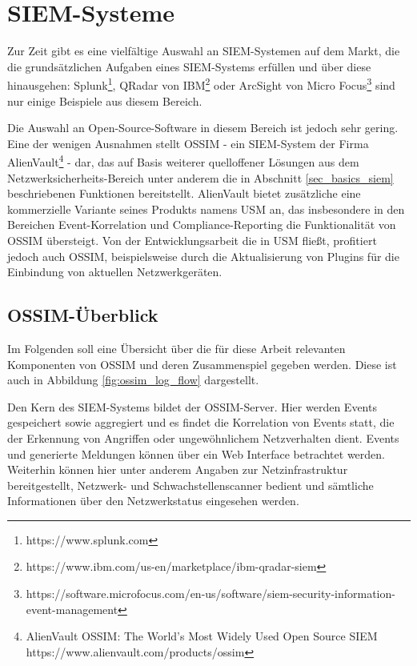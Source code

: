 \section{SIEM-Systeme}

\label{sec_state_siem}

Zur Zeit gibt es eine vielfältige Auswahl an SIEM-Systemen auf dem Markt, die die grundsätzlichen Aufgaben eines SIEM-Systems erfüllen und über diese hinausgehen: Splunk\footnote{
  https://www.splunk.com
}, QRadar von IBM\footnote{
  https://www.ibm.com/us-en/marketplace/ibm-qradar-siem
} oder ArcSight von Micro Focus\footnote{
  https://software.microfocus.com/en-us/software/siem-security-information-event-management
} sind nur einige Beispiele aus diesem Bereich. 

Die Auswahl an Open-Source-Software in diesem Bereich ist jedoch sehr gering. Eine der wenigen Ausnahmen stellt OSSIM - ein SIEM-System der Firma AlienVault\footnote{
	AlienVault OSSIM: The World’s Most Widely Used Open Source SIEM\\https://www.alienvault.com/products/ossim
} - dar, das auf Basis weiterer quelloffener Lösungen aus dem Netzwerksicherheits-Bereich unter anderem die in Abschnitt \ref{sec_basics_siem} beschriebenen Funktionen bereitstellt. AlienVault bietet zusätzliche eine kommerzielle Variante seines Produkts namens USM an, das insbesondere in den Bereichen Event-Korrelation und Compliance-Reporting die Funktionalität von OSSIM übersteigt. Von der Entwicklungsarbeit die in USM fließt, profitiert jedoch auch OSSIM, beispielsweise durch die Aktualisierung von Plugins für die Einbindung von aktuellen Netzwerkgeräten.

\subsection*{OSSIM-Überblick}

Im Folgenden soll eine Übersicht über die für diese Arbeit relevanten Komponenten von OSSIM und deren Zusammenspiel gegeben werden. Diese ist auch in Abbildung \ref{fig:ossim_log_flow} dargestellt.

Den Kern des SIEM-Systems bildet der OSSIM-Server. Hier werden Events gespeichert sowie aggregiert und es findet die Korrelation von Events statt, die der Erkennung von Angriffen oder ungewöhnlichem Netzverhalten dient. Events und generierte Meldungen können über ein Web Interface betrachtet werden. Weiterhin können hier unter anderem Angaben zur Netzinfrastruktur bereitgestellt, Netzwerk- und Schwachstellenscanner bedient und sämtliche Informationen über den Netzwerkstatus eingesehen werden. 


